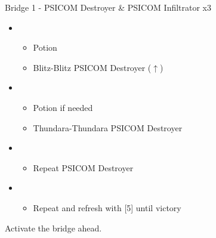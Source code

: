 	\begin{battle}[0:28]{Bridge 1 - PSICOM Destroyer \& PSICOM Infiltrator x3}
		\begin{itemize}
			\item \first
			      \begin{itemize}
				      \item Potion
				      \item Blitz-Blitz PSICOM Destroyer ($\uparrow$)
			      \end{itemize}
			\item \second
			      \begin{itemize}
				      \item Potion if needed
				      \item Thundara-Thundara PSICOM Destroyer
			      \end{itemize}
			\item \first
			      \begin{itemize}
				      \item Repeat PSICOM Destroyer
			      \end{itemize}
			\item \fourth
			      \begin{itemize}
				      \item Repeat and refresh with [5] until victory
			      \end{itemize}
		\end{itemize}
		  
	\end{battle}
	Activate the bridge ahead.
	\vfill

